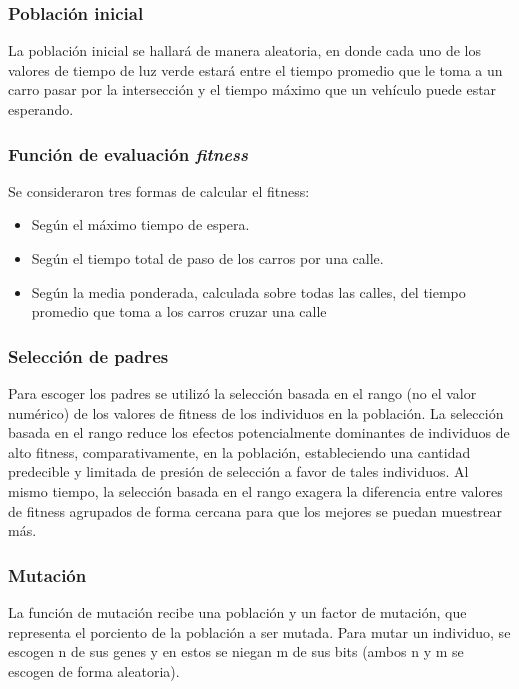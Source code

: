 \documentclass[twoside,twocolumn]{article} %
\begin{document}
	\subsubsection{Población inicial}
	
	La población inicial se hallará de manera aleatoria, en donde cada uno de los valores de tiempo de luz verde estará entre el tiempo promedio que le toma a un carro pasar por la intersección y el tiempo máximo que un vehículo puede estar esperando. 
	
	\subsubsection{Función de evaluación \textit{fitness}}
	
	Se consideraron tres formas de calcular el fitness:
	\begin{itemize}
		\item Seg\'un el m\'aximo tiempo de espera. 
		\item Seg\'un el tiempo total de paso de los carros por una calle. 
		\item Seg\'un la media ponderada, calculada sobre todas las calles, del tiempo promedio que toma a los carros cruzar una calle
	\end{itemize}

	\subsubsection{Selección de padres}
	
	Para escoger los padres se utiliz\'o la selección basada en el rango (no el valor numérico) de los valores de fitness de los individuos en la población. La selección basada en el rango reduce los efectos potencialmente dominantes de individuos de alto fitness, comparativamente, en la población, estableciendo una cantidad predecible y limitada de presión de selección a favor de tales individuos. Al mismo tiempo, la selección basada en el rango exagera la diferencia entre valores de fitness agrupados de forma cercana para que los mejores se puedan muestrear más.
	
	\subsubsection{Mutación}
	
	La funci\'on de mutaci\'on recibe una poblaci\'on y un factor de mutaci\'on, que representa el porciento de la poblaci\'on a ser mutada. Para mutar un individuo, se escogen n de sus genes y en estos se niegan m de sus bits (ambos n y m se escogen de forma aleatoria).
	
\end{document}
